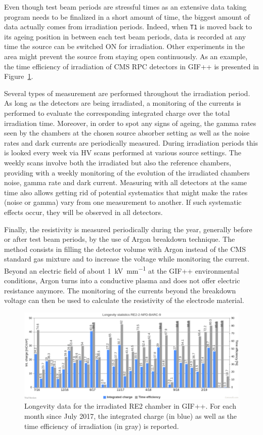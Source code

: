 	Even though test beam periods are stressful times as an extensive data taking program needs to be finalized in a short amount of time, the biggest amount of data actually comes from irradiation periods. Indeed, when \texttt{T1} is moved back to its ageing position in between each test beam periods, data is recorded at any time the source can be switched ON for irradiation. Other experiments in the area might prevent the source from staying open continuously. As an example, the time efficiency of irradiation of CMS RPC detectors in GIF++ is presented in Figure~\ref{fig:Irr-stat}.
	
	Several types of measurement are performed throughout the irradiation period. As long as the detectors are being irradiated, a monitoring of the currents is performed to evaluate the corresponding integrated charge over the total irradiation time. Moreover, in order to spot any signs of ageing, the gamma rates seen by the chambers at the chosen source absorber setting as well as the noise rates and dark currents are periodically measured. During irradiation periods this is looked every week via HV scans performed at various source settings. The weekly scans involve both the irradiated but also the reference chambers, providing with a weekly monitoring of the evolution of the irradiated chambers noise, gamma rate and dark current. Measuring with all detectors at the same time also allows getting rid of potential systematics that might make the rates (noise or gamma) vary from one measurement to another. If such systematic effects occur, they will be observed in all detectors.
	
	Finally, the resistivity is measured periodically during the year, generally before or after test beam periods, by the use of Argon breakdown technique. The method consists in filling the detector volume with Argon instead of the CMS standard gas mixture and to increase the voltage while monitoring the current. Beyond an electric field of about \SI{1}{kV.mm^{-1}} at the GIF++ environmental conditions, Argon turns into a conductive plasma and does not offer electric resistance anymore. The monitoring of the currents beyond the breakdown voltage can then be used to calculate the resistivity of the electrode material.

	\begin{figure}[H]
        \centering
		\includegraphics[width = \linewidth]{fig/chapt5/GIFpp-irradiation-statistics.png}
		\caption{\label{fig:Irr-stat} Longevity data for the irradiated RE2 chamber in GIF++. For each month since July 2017, the integrated charge (in blue) as well as the time efficiency of irradiation (in gray) is reported.}
	\end{figure}
	
